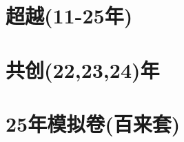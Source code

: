 \documentclass[12pt, a4paper, oneside, UTF8]{ctexbook}
\begin{document}
\newpage
\section{超越(11-25年)}

\newpage
\section{共创(22,23,24)年}

\newpage
\section{25年模拟卷(百来套)}

\ifx\allfiles\undefined
\end{document}
